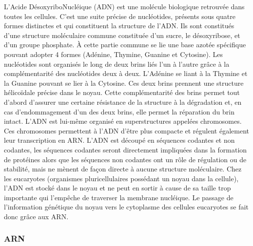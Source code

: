 L'Acide DésoxyriboNucléique (ADN) est une molécule biologique retrouvée dans toutes les cellules. C'est une suite précise de nucléotides, présents sous quatre formes distinctes et qui constituent la structure de l'ADN. Ils sont constitués d'une structure moléculaire commune constituée d'un sucre, le désoxyribose, et d'un groupe phosphate. À cette partie commune se lie une base azotée spécifique pouvant adopter 4 formes (Adénine, Thymine, Guanine et Cytosine). Les nucléotides sont organisés le long de deux brins liés l'un à l'autre grâce à la complémentarité des nucléotides deux à deux. L'Adénine se liant à la Thymine et la Guanine pouvant se lier à la Cytosine. Ces deux brins prennent une structure hélicoïdale précise dans le noyau. Cette complémentarité des brins permet tout d'abord d'assurer une certaine résistance de la structure à la dégradation et, en cas d'endommagement d'un des deux brins, elle permet la réparation du brin intact. L'ADN est lui-même organisé en superstructures appelées chromosomes. Ces chromosomes permettent à l'ADN d'être plus compacte et régulent également leur transcription en ARN.
L'ADN est découpé en séquences codantes et non codantes, les séquences codantes seront directement impliquées dans la formation de protéines alors que les séquences non codantes ont un rôle de régulation ou de stabilité, mais ne mènent de façon directe à aucune structure moléculaire.
Chez les eucaryotes (organismes pluricellulaires possédant un noyau dans la cellule), l'ADN est stocké dans le noyau et ne peut en sortir à cause de sa taille trop importante qui l'empêche de traverser la membrane nucléique. Le passage de l'information génétique du noyau vers le cytoplasme des cellules eucaryotes se fait donc grâce aux ARN.

\subsubsection{ARN}

